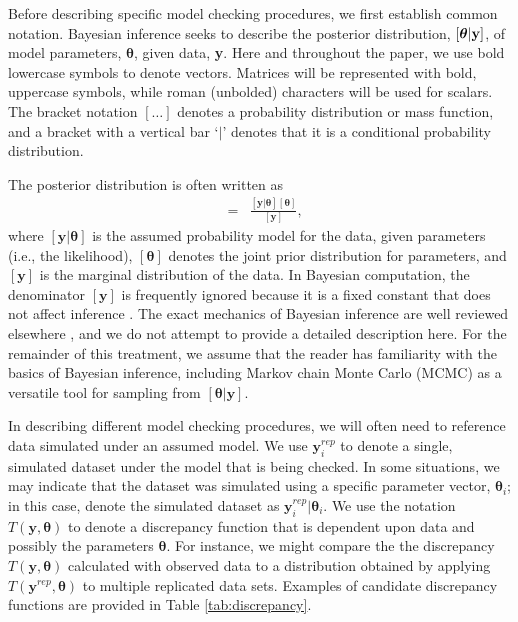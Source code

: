\documentclass[12pt,english]{article}
\begin{document}
\begin{spacing}{1.9}
Before describing specific model checking procedures, we first establish common notation.  Bayesian inference seeks to describe the posterior distribution, $[\boldsymbol{\theta} | {\bf y}]$, of model parameters, $\boldsymbol{\theta}$, given data, \textbf{y}.  Here and throughout the paper, we use bold lowercase symbols to denote vectors.  Matrices will be represented with bold, uppercase symbols, while roman (unbolded) characters will be used for scalars.  The bracket notation $[ \hdots ]$ denotes a probability distribution or mass function, and a bracket with a vertical bar `$|$' denotes that it is a conditional probability distribution.

The posterior distribution is often written as
\begin{eqnarray}
  [\boldsymbol{\theta} | \textbf{y}] & = & \frac{[\textbf{y} | \boldsymbol{\theta}] [\boldsymbol{\theta}]}{[\textbf{y}]},
\end{eqnarray}
where $[\textbf{y}|\boldsymbol{\theta}]$ is the assumed probability model for the data, given parameters (i.e., the likelihood), $[\boldsymbol{\theta}]$ denotes the joint prior distribution for parameters, and $[\textbf{y}]$ is the marginal distribution of the data.  In Bayesian computation, the denominator $[\textbf{y}]$ is frequently ignored because it is a fixed constant that does not affect inference \citep[although it is needed when computing Bayes factors for model comparison and averaging;][]{LinkBarker2006}.
The exact mechanics of Bayesian inference are well reviewed elsewhere \citep[e.g.,][]{KingEtAl2009,LinkBarker2010,HobbsHooten2015}, and we do not attempt to provide a detailed description here.  For the remainder of this treatment, we assume that the reader has familiarity with the basics of Bayesian inference, including Markov chain Monte Carlo (MCMC) as a versatile tool for sampling from $[\boldsymbol{\theta}|\textbf{y}]$.

In describing different model checking procedures, we will often need to reference data simulated under an assumed model.  We use $\textbf{y}_i^{rep}$ to denote a single, simulated dataset under the model that is being checked.  In some situations, we may indicate that the dataset was simulated using a specific parameter vector, $\boldsymbol{\theta}_i$; in this case, denote the simulated dataset as $\textbf{y}_i^{rep}|\boldsymbol{\theta}_i$.  We use the notation $T(\textbf{y},\boldsymbol{\theta})$ to denote a discrepancy function that is dependent upon data and possibly the parameters $\boldsymbol{\theta}$.  For instance, we might compare the the discrepancy $T(\textbf{y},\boldsymbol{\theta})$ calculated with observed data to a distribution obtained by applying $T(\textbf{y}^{rep},\boldsymbol{\theta})$ to multiple replicated data sets.  Examples of candidate discrepancy functions are provided in Table \ref{tab:discrepancy}.


\end{spacing}
\end{document}
